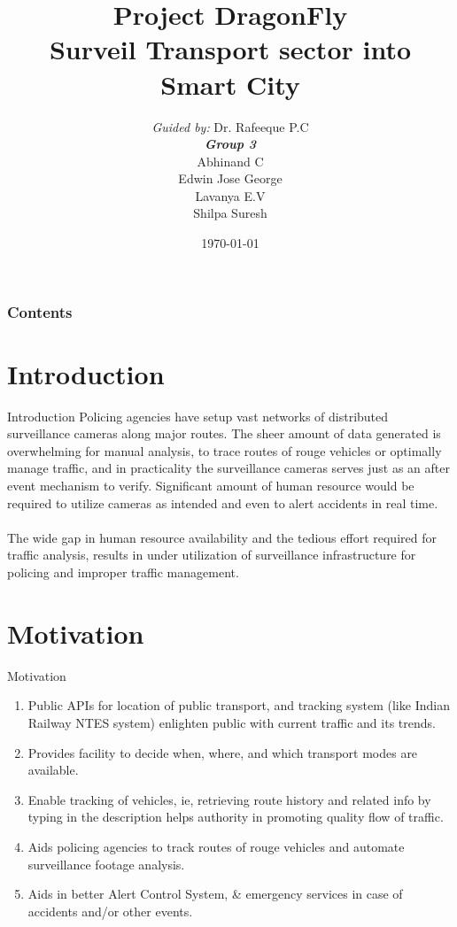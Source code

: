 \documentclass{beamer}
\title[DragonFly]{Project DragonFly \\ Surveil Transport sector into Smart City}
\author[Group 3]{
	{\small \textit{Guided by:}} Dr. Rafeeque P.C \\
	\medskip
	{\small \textbf{\textit{Group 3}}} \\
	Abhinand C \\
	Edwin Jose George \\
	Lavanya E.V \\
	Shilpa Suresh
}
\institute[GCEK]{Government College of Engineering Kannur}
\date{\today}
\begin{document}
\begin{frame}
\titlepage
\end{frame}

\begin{frame}
\frametitle{Contents}
\tableofcontents
\end{frame}


\section{Introduction}
\begin{frame}{Introduction}
    Policing agencies have setup vast networks of distributed surveillance cameras along major routes. The sheer amount of data generated is overwhelming for manual analysis, to trace routes of rouge vehicles or optimally manage traffic, and in practicality the surveillance cameras serves just as an after event mechanism to verify. Significant amount of human resource would be required to utilize cameras as intended and even to alert accidents in real time. \\~\\

    The wide gap in human resource availability and the tedious effort required for traffic analysis, results in under utilization of surveillance infrastructure for policing and improper traffic management.    
\end{frame}



\section{Motivation}
\begin{frame}{Motivation}
	\begin{enumerate}
	    \item Public APIs for location of public transport, and tracking system (like Indian Railway NTES system) enlighten public with current traffic and its trends.
	    \item Provides facility to decide when, where, and which transport modes are available.
		\item Enable tracking of vehicles, ie, retrieving route history and related info by typing in the description helps authority in promoting quality flow of traffic.
		\item Aids policing agencies to track routes of rouge vehicles and automate surveillance footage analysis.
		\item Aids in better Alert Control System, \& emergency services in case of accidents and/or other events.		
	\end{enumerate}
\end{frame}
\end{document}
